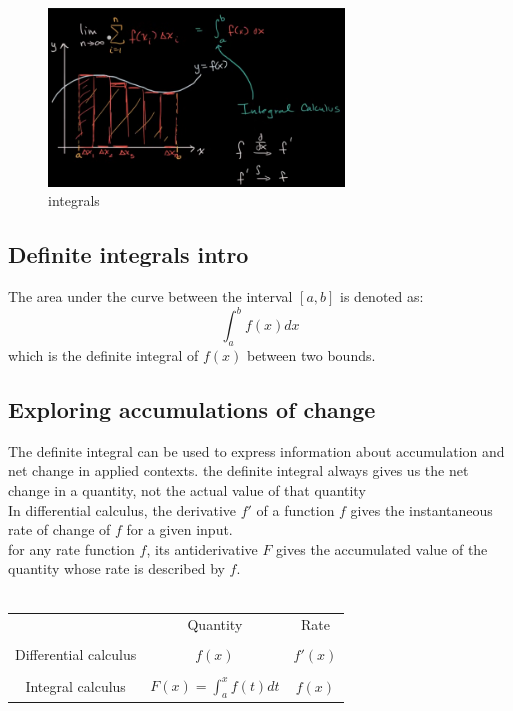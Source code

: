 \documentclass{article}
\begin{document}
            \begin{figure}[ht]
                \centering
                \includegraphics[bb=0 0 717 432, width=0.7\textwidth]{images/intro_integral.png}
                \caption{integrals}\label{fig:integral}
            \end{figure}
        \subsection{Definite integrals intro}
            The area under the curve between the interval \([a,b]\) is denoted as: 
                 \[\int_{a}^{b} f(x)dx\]
            which is the definite integral of \(f(x)\) between two bounds.
        \subsection{Exploring accumulations of change}
            The definite integral can be used to express information about accumulation and net change in applied contexts.
            the definite integral always gives us the net change in a quantity, not the actual value of that quantity\\
            In differential calculus, the derivative \(f'\) of a function \(f\) gives the instantaneous rate of change of \(f\) for a given input.\\
            for any rate function \(f\), its antiderivative \(F\) gives the accumulated value of the quantity whose rate is described by \(f\).\\\\
            \begin{center}
                \begin{tabular}{ c c c } 
                    & Quantity & Rate \\
                    \\
                    \multirow{1}{10em}{Differential calculus } & \(f(x)\) & \(f'(x)\) \\\\ 
                    \multirow{1}{10em}{Integral calculus} & \(F(x) = \int_{a}^{x}f(t)dt\) & \(f(x)\) \\ 
            
                    
                \end{tabular} 
            \end{center}
\end{document}
